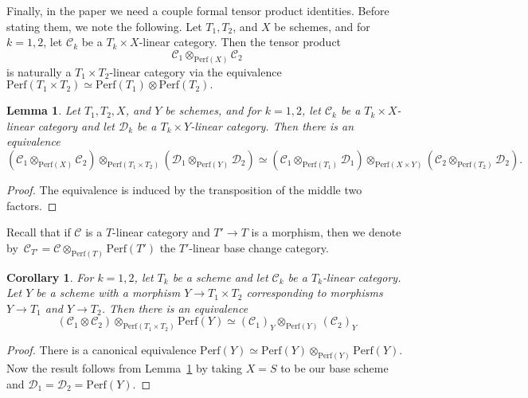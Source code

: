 \documentclass[11pt, reqno]{amsart}
\numberwithin{equation}{section}
\theoremstyle{plain}
\newtheorem{lemma}[theorem]{Lemma}
\newtheorem{corollary}[theorem]{Corollary}
\theoremstyle{definition}
\newcommand{\Perf}{\mathrm{Perf}}
\newcommand{\sotimes}{\otimes}
\newcommand{\stimes}{\times}
\newcommand{\cC}{\mathcal{C}}
\newcommand{\cD}{\mathcal{D}}
\begin{document}
Finally, in the paper we need a couple formal tensor product identities. 
Before stating them, we note the following. 
Let $T_1, T_2$, and $X$ be schemes, and for $k=1,2$, let $\cC_k$ be a $T_k \times X$-linear category.  
Then the tensor product
\begin{equation*}
\cC_1 \otimes_{\Perf(X)} \cC_2 
\end{equation*}
is naturally a $T_1 \times T_2$-linear category via 
the equivalence 
$\Perf(T_1 \stimes T_2) \simeq \Perf(T_1) \sotimes \Perf(T_2).$ 

\begin{lemma}
\label{lemma-fiber-product-categories}
Let $T_1, T_2, X$, and $Y$ be schemes, and for $k=1,2$, let $\cC_k$ be a $T_k \times X$-linear category 
and let $\cD_k$ be a $T_k \times Y$-linear category.
Then there is an equivalence 
\begin{equation*}
\left( \cC_1 \otimes_{\Perf(X)} \cC_2 \right) \otimes_{\Perf(T_1 \stimes T_2)} \left(  \cD_1 \otimes_{\Perf(Y)} \cD_2 \right) 
\! \simeq \!
\left(  \cC_1 \otimes_{\Perf(T_1)}  \cD_1 \right) \otimes_{\Perf(X \stimes Y)} \left(  \cC_2 \otimes_{\Perf(T_2)} \cD_2 \right) . 
\end{equation*}
\end{lemma}

\begin{proof}
The equivalence is induced by the transposition of the middle two factors. 
\end{proof} 

Recall that if $\cC$ is a $T$-linear category and $T' \to T$ is a morphism, 
then we denote by~\mbox{$\cC_{T'} = \cC \otimes_{\Perf(T)} \Perf(T')$} the $T'$-linear base change category. 

\begin{corollary}
\label{corollary-base-change-along-diagonal}
For $k=1,2$, let $T_k$ be a scheme and let $\cC_k$ be a $T_k$-linear category. 
Let $Y$ be a scheme with a morphism $Y \to T_1 \stimes T_2$ corresponding 
to morphisms $Y \to T_1$ and $Y \to T_2$. 
Then there is an equivalence 
\begin{equation*}
\left( \cC_1 \sotimes \cC_2 \right) \otimes_{\Perf(T_1 \stimes T_2)} \Perf(Y) 
\simeq 
(\cC_{1})_Y \otimes_{\Perf(Y)} (\cC_2)_Y 
\end{equation*}
\end{corollary}

\begin{proof}
There is a canonical equivalence $\Perf(Y) \simeq \Perf(Y) \otimes_{\Perf(Y)} \Perf(Y)$. 
Now the result follows from Lemma~\ref{lemma-fiber-product-categories} by 
taking $X = S$ to be our base scheme and $\cD_1 = \cD_2 =  \Perf(Y)$. 
\end{proof}  
\end{document}
